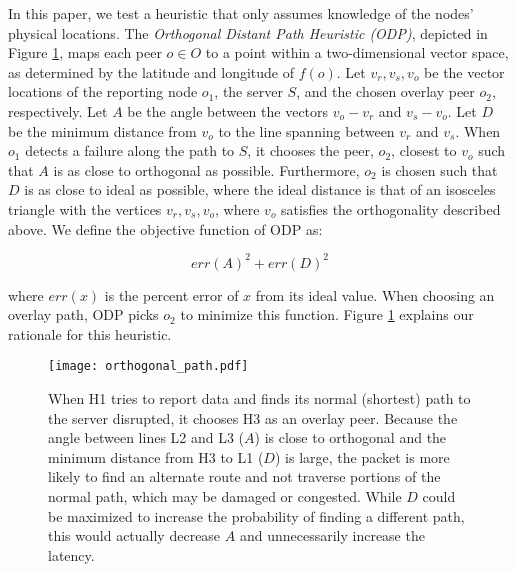 \documentclass[conference]{IEEEtran}
\begin{document}
In this paper, we test a heuristic that only assumes knowledge of the nodes' physical locations.
The \emph{Orthogonal Distant Path Heuristic (ODP)}, depicted in Figure \ref{fig_orthogonal_path}, maps each peer $o \in O$ to a point within a two-dimensional vector space, as determined by the latitude and longitude of $f(o)$.
Let $v_r, v_s, v_o$ be the vector locations of the reporting node $o_1$, the server $S$, and the chosen overlay peer $o_2$, respectively.
Let $A$ be the angle between the vectors $v_o - v_r$ and $v_s - v_o$.
Let $D$ be the minimum distance from $v_o$ to the line spanning between $v_r$ and $v_s$.
When $o_1$ detects a failure along the path to $S$, it chooses the peer, $o_2$, closest to $v_o$ such that $A$ is as close to orthogonal as possible.
Furthermore, $o_2$ is chosen such that $D$ is as close to ideal as possible, where the ideal distance is that of an isosceles triangle with the vertices $v_r, v_s, v_o$, where $v_o$ satisfies the orthogonality described above.
We define the objective function of ODP as:

\begin{equation}
  \label{odp_objective_function}
 err(A)^2 + err(D)^2
\end{equation}

where $err(x)$ is the percent error of $x$ from its ideal value.
When choosing an overlay path, ODP picks $o_2$ to minimize this function.
Figure \ref{fig_orthogonal_path} explains our rationale for this heuristic.


\begin{figure}
\centering
\texttt{[image: orthogonal\_path.pdf]}
\caption{When H1 tries to report data and finds its normal (shortest) path to the server disrupted, it chooses H3 as an overlay peer.
Because the angle between lines L2 and L3 ($A$) is close to orthogonal and the minimum distance from H3 to L1 ($D$) is large, the packet is more likely to find an alternate route and not traverse portions of the normal path, which may be damaged or congested.
While $D$ could be maximized to increase the probability of finding a different path, this would actually decrease $A$ and unnecessarily increase the latency.}
\label{fig_orthogonal_path}
\end{figure}

\end{document}
